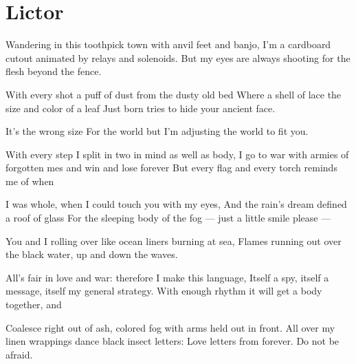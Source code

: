 \documentclass[english,11pt,letterpaper,onecolumn]{scrbook}
\begin{document}
\newpage
\section{Lictor}

\begin{poem}
\begin{stanza}
Wandering in this toothpick town with anvil feet and banjo,\verseline
I'm a cardboard cutout animated by relays and solenoids.\verseline
But my eyes are always shooting for the flesh beyond the fence.
\end{stanza}

\begin{stanza}
With every shot a puff of dust from the dusty old bed\verseline
Where a shell of lace the size and color of a leaf\verseline
Just born tries to hide your ancient face.
\end{stanza}

\begin{stanza}
It's the wrong size\verseline
For the world but I'm adjusting the world to fit you.
\end{stanza}

\begin{stanza}
With every step I split in two in mind as well as body,\verseline
I go to war with armies of forgotten mes and win and lose forever\verseline
But every flag and every torch reminds me of when
\end{stanza}

\begin{stanza}
I was whole, when I could touch you with my eyes,\verseline
And the rain's dream defined a roof of glass\verseline
For the sleeping body of the fog --- just a little smile please ---
\end{stanza}

\begin{stanza}
You and I rolling over like ocean liners burning at sea,\verseline
Flames running out over the black water, up and down the waves.
\end{stanza}

\begin{stanza}
All's fair in love and war:  therefore I make this language,\verseline
Itself a spy, itself a message, itself my general strategy.\verseline
With enough rhythm it will get a body together, and
\end{stanza}

\begin{stanza}
Coalesce right out of ash, colored fog with arms held out in front.\verseline
All over my linen wrappings dance black insect letters:\verseline
Love letters from forever.  Do not be afraid.
\end{stanza}


\end{poem}
\end{document}
